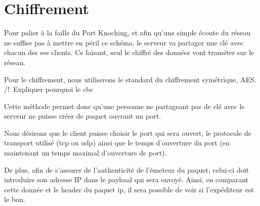\chapter{Chiffrement}

Pour palier à la faille du Port Knocking, et afin qu'une simple écoute du réseau ne suffise pas à mettre en péril ce schéma, le serveur va partager une clé avec chacun des ses clients. Ce faisant, seul le chiffré des données vont transiter sur le réseau.

Pour le chiffrement, nous utiliserons le standard du chiffrement symétrique, AES.
/!\ Expliquer pourquoi le cbc

Cette méthode permet donc qu'une personne ne partageant pas de clé avec le serveur ne puisse créer de paquet ouvrant un port.

Nous désirons que le client puisse choisir le port qui sera ouvert, le protocole de transport utilisé (tcp ou udp) ainsi que le temps d'ouverture du port (en maintenant un temps maximal d'ouverture de port).

De plus, afin de s'assurer de l'authenticité de l'émeteur du paquet, celui-ci doit introduire son adresse IP dans le payload qui sera envoyé. Ainsi, en comparant cette donnée et le header du paquet ip, il sera possible de voir si l'expéditeur est le bon.

